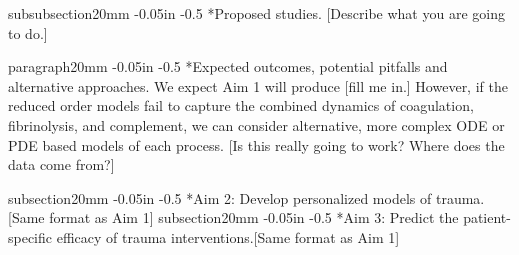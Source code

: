 \documentclass[12pt]{article}
\makeatletter
\renewcommand\subsection{\@startsection
	{subsection}{2}{0mm}
	{-0.05in}
	{-0.5\baselineskip}
	{\normalfont\normalsize\bfseries}}
\renewcommand\subsubsection{\@startsection
	{subsubsection}{2}{0mm}
	{-0.05in}
	{-0.5\baselineskip}
	{\normalfont\normalsize\bfseries}}
\renewcommand\paragraph{\@startsection
  {paragraph}{2}{0mm}
  {-0.05in}
  {-0.5\baselineskip}
  {\normalfont\normalsize\itshape}}
\makeatother
\begin{document}
\subsubsection*{Proposed studies.}
[Describe what you are going to do.]


\paragraph*{Expected outcomes, potential pitfalls and alternative approaches.}
We expect Aim 1 will produce [fill me in.] However, if the reduced order models fail to capture the combined dynamics of coagulation, fibrinolysis, and complement, we can consider alternative, more complex ODE or PDE based models of each process. [Is this really going to work? Where does the data come from?]


\subsection*{Aim 2: Develop personalized models of trauma. }[Same format as Aim 1]
\subsection*{Aim 3: Predict the patient-specific efficacy of trauma interventions.}[Same format as Aim 1]
\end{document}
